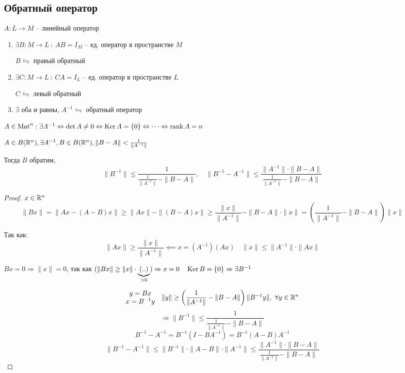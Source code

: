     \subsection*{Обратный оператор}
    
    $A : L \rightarrow M$ -- линейный оператор

    \begin{enumerate}
        \item $\exists B : M \rightarrow L \ : \ AB = I_M$ -- ед. оператор в пространстве $M$
        \par $B \leftrightharpoons$ правый обратный
        \item $\exists C : M \rightarrow L \ : \ CA = I_L$ -- ед. оператор в пространстве $L$
        \par $C \leftrightharpoons$ левый обратный
        \item $\exists$ оба и равны, $A^{-1} \leftrightharpoons$ обратный оператор
    \end{enumerate}

    $A \in \operatorname{Mat}^{n} : \exists A^{-1} \Leftrightarrow \det A \not= 0 \Leftrightarrow \operatorname{Ker} A = \{0\} \Leftrightarrow \dots \Leftrightarrow \operatorname{rank} A = n$

    \begin{theorem}
        $A \in B(\mathbb{R}^n), \exists A^{-1}, B \in B(\mathbb{R}^n), \| B - A \| < \frac{1}{\| A^{-1} \|}$
        \par Тогда $B$ обратим,
        \[
            \| B^{-1} \| \le \frac{1}{\frac{1}{\| A^{-1} \|}  - \| B - A \|},\quad \| B^{-1} - A^{-1} \| \le \frac{\| A^{-1} \| \cdot \| B - A \|}{\frac{1}{\| A^{-1} \|} - \| B - A \|}  
        \]
    \end{theorem}

    \begin{proof}
        $x \in \mathbb{R}^n$
        \[
            \| Bx \| = \| Ax - (A-B)x \| \ge \| Ax \| - \| (B-A)x \| \ge \frac{\| x \|}{\| A^{-1} \|} - \| B-A \| \cdot \| x \| = \left(\frac{1}{\|A^{-1}\|} - \|B-A\|\right) \|x\|
        \]
        \par Так как:
        \[
            \|Ax\| \ge \frac{\|x\|}{\|A^{-1}\|} \impliedby x = (A^{-1})(Ax) \quad \|x\| \le \|A^{-1}\| \cdot \|Ax\|  
        \]
        
            $Bx = 0 \Rightarrow \|x\| = 0$, так как  $(\|Bx\| \ge \|x\| \cdot \underbrace{(..)}_{>0}) \Rightarrow x = 0 \quad \operatorname{Ker} B = \{0\} \Rightarrow \exists B^{-1}$  
        
        \[
            \begin{matrix} y = Bx \\ x = B^{-1}y \end{matrix} \quad \|y\| \ge \left(\frac{1}{\|A^{-1}\|} - \|B-A\|\right)\|B^{-1}y\|, \ \forall y \in \mathbb{R}^n  
        \]
        \[
            \Rightarrow \|B^{-1}\| \le \frac{1}{\frac{1}{\|A^{-1}\|} - \|B-A\|}    
        \]
        \[
            B^{-1} - A^{-1} = B^{-1}(I-BA^{-1}) = B^{-1}(A-B)A^{-1}
        \]
        \[
            \|B^{-1}-A^{-1}\| \le \|B^{-1}\| \cdot \|A - B\| \cdot \|A^{-1}\| \le \frac{\|A^{-1}\| \cdot \|B-A\|}{\frac{1}{\|A^{-1}\|} - \|B-A\|}
        \]
    \end{proof}

